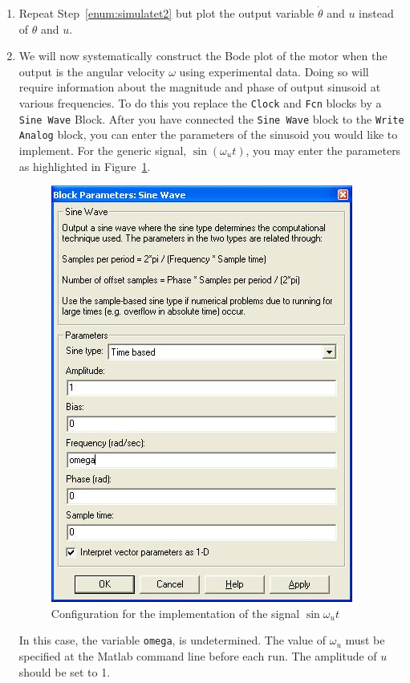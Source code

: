 \begin{enumerate}
\item Repeat Step~\ref{enum:simulatet2} but plot the output variable
$\dot\theta$ and $u$ instead of $\theta$ and $u$\@.

\item We will now systematically construct the Bode plot of the motor when
the output is the angular velocity $\omega$ using experimental data. Doing so
will require information about the magnitude and phase of output sinusoid at
various frequencies.  To do this you replace the \verb|Clock| and \verb|Fcn|
blocks by a \verb|Sine Wave| Block.  After you have connected the
\verb|Sine Wave| block to the \verb|Write Analog| block, you can enter the
parameters of the sinusoid you would like to implement.  For the generic
signal, $\sin(\omega_u t)$\@, you may enter the parameters as highlighted in
Figure~\ref{fig:sineConfig}\@.
\begin{figure}[htbp]
\centering
\includegraphics{pix/freqResponseSineConfig.jpg}
\caption{Configuration for the implementation of the signal
$\sin{\omega_u t}$}\label{fig:sineConfig}
\end{figure}%
In this case, the variable \verb|omega|, is undetermined.  The value of
$\omega_u$ must be specified at the \textsf{Matlab} command line before each
run.  The amplitude of $u$ should be set to 1.


\end{enumerate}
